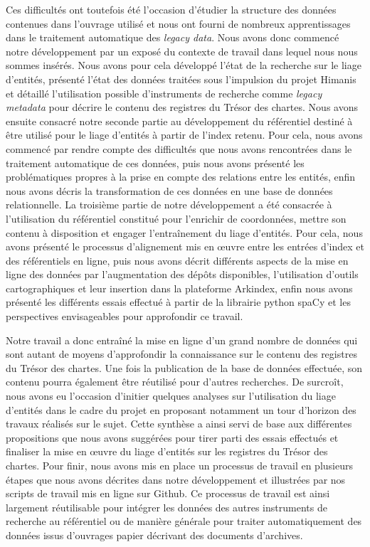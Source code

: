\documentclass[a4paper,12pt,twoside]{book}
\begin{document}
	Ces difficultés ont toutefois été l'occasion d'étudier la structure des données contenues dans l'ouvrage utilisé et nous ont fourni de nombreux apprentissages dans le traitement automatique des \textit{legacy data}. Nous avons donc commencé notre développement par un exposé du contexte de travail dans lequel nous nous sommes insérés. Nous avons pour cela développé l'état de la recherche sur le liage d'entités, présenté l'état des données traitées sous l'impulsion du projet Himanis et détaillé l'utilisation possible d'instruments de recherche comme \textit{legacy metadata} pour décrire le contenu des registres du Trésor des chartes. Nous avons ensuite consacré notre seconde partie au développement du référentiel destiné à être utilisé pour le liage d'entités à partir de l'index retenu. Pour cela, nous avons commencé par rendre compte des difficultés que nous avons rencontrées dans le traitement automatique de ces données, puis nous avons présenté les problématiques propres à la prise en compte des relations entre les entités, enfin nous avons décris la transformation de ces données en une base de données relationnelle. La troisième partie de notre développement a été consacrée à l'utilisation du référentiel constitué pour l'enrichir de coordonnées, mettre son contenu à disposition et engager l'entraînement du liage d'entités. Pour cela, nous avons présenté le processus d'alignement mis en œuvre entre les entrées d'index et des référentiels en ligne, puis nous avons décrit différents aspects de la mise en ligne des données par l'augmentation des dépôts disponibles, l'utilisation d'outils cartographiques et leur insertion dans la plateforme Arkindex, enfin nous avons présenté les différents essais effectué à partir de la librairie python spaCy et les perspectives envisageables pour approfondir ce travail.
	
	Notre travail a donc entraîné la mise en ligne d'un grand nombre de données qui sont autant de moyens d'approfondir la connaissance sur le contenu des registres du Trésor des chartes. Une fois la publication de la base de données effectuée, son contenu pourra également être réutilisé pour d'autres recherches. De surcroît, nous avons eu l'occasion d'initier quelques analyses sur l'utilisation du liage d'entités dans le cadre du projet en proposant notamment un tour d'horizon des travaux réalisés sur le sujet. Cette synthèse a ainsi servi de base aux différentes propositions que nous avons suggérées pour tirer parti des essais effectués et finaliser la mise en œuvre du liage d'entités sur les registres du Trésor des chartes. Pour finir, nous avons mis en place un processus de travail en plusieurs étapes que nous avons décrites dans notre développement et illustrées par nos scripts de travail mis en ligne sur Github. Ce processus de travail est ainsi largement réutilisable pour intégrer les données des autres instruments de recherche au référentiel ou de manière générale pour traiter automatiquement des données issus d'ouvrages papier décrivant des documents d'archives.
	
\end{document}
